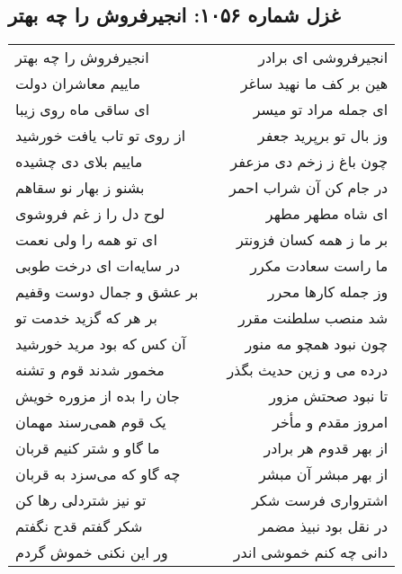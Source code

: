 \begin{center}
\section*{غزل شماره ۱۰۵۶: انجیرفروش را چه بهتر}
\label{sec:1056}
\begin{longtable}{l p{0.5cm} r}
انجیرفروش را چه بهتر
&&
انجیرفروشی ای برادر
\\
ماییم معاشران دولت
&&
هین بر کف ما نهید ساغر
\\
ای ساقی ماه روی زیبا
&&
ای جمله مراد تو میسر
\\
از روی تو تاب یافت خورشید
&&
وز بال تو برپرید جعفر
\\
ماییم بلای دی چشیده
&&
چون باغ ز زخم دی مزعفر
\\
بشنو ز بهار نو سقاهم
&&
در جام کن آن شراب احمر
\\
لوح دل را ز غم فروشوی
&&
ای شاه مطهر مطهر
\\
ای تو همه را ولی نعمت
&&
بر ما ز همه کسان فزونتر
\\
در سایه‌ات ای درخت طوبی
&&
ما راست سعادت مکرر
\\
بر عشق و جمال دوست وقفیم
&&
وز جمله کارها محرر
\\
بر هر که گزید خدمت تو
&&
شد منصب سلطنت مقرر
\\
آن کس که بود مرید خورشید
&&
چون نبود همچو مه منور
\\
مخمور شدند قوم و تشنه
&&
درده می و زین حدیث بگذر
\\
جان را بده از مزوره خویش
&&
تا نبود صحتش مزور
\\
یک قوم همی‌رسند مهمان
&&
امروز مقدم و مأخر
\\
ما گاو و شتر کنیم قربان
&&
از بهر قدوم هر برادر
\\
چه گاو که می‌سزد به قربان
&&
از بهر مبشر آن مبشر
\\
تو نیز شتردلی رها کن
&&
اشترواری فرست شکر
\\
شکر گفتم قدح نگفتم
&&
در نقل بود نبیذ مضمر
\\
ور این نکنی خموش گردم
&&
دانی چه کنم خموشی اندر
\\
\end{longtable}
\end{center}
